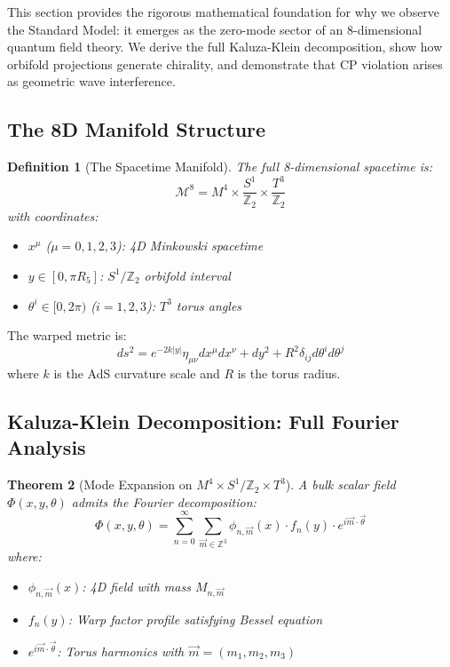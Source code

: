 \documentclass[12pt,a4paper]{article}
\newtheorem{theorem}{Theorem}[section]
\newtheorem{definition}[theorem]{Definition}
\begin{document}
This section provides the rigorous mathematical foundation for why we observe the Standard Model: it emerges as the zero-mode sector of an 8-dimensional quantum field theory. We derive the full Kaluza-Klein decomposition, show how orbifold projections generate chirality, and demonstrate that CP violation arises as geometric wave interference.

\subsection{The 8D Manifold Structure}

\begin{definition}[The Spacetime Manifold]
The full 8-dimensional spacetime is:
\begin{equation}
\mathcal{M}^8 = M^4 \times \frac{S^1}{\mathbb{Z}_2} \times \frac{T^3}{\mathbb{Z}_2}
\end{equation}
with coordinates:
\begin{itemize}
    \item $x^\mu$ ($\mu = 0,1,2,3$): 4D Minkowski spacetime
    \item $y \in [0, \pi R_5]$: $S^1/\mathbb{Z}_2$ orbifold interval
    \item $\theta^i \in [0, 2\pi)$ ($i = 1,2,3$): $T^3$ torus angles
\end{itemize}
\end{definition}

The warped metric is:
\begin{equation}
ds^2 = e^{-2k|y|}\eta_{\mu\nu}dx^\mu dx^\nu + dy^2 + R^2\delta_{ij}d\theta^i d\theta^j
\end{equation}
where $k$ is the AdS curvature scale and $R$ is the torus radius.

\subsection{Kaluza-Klein Decomposition: Full Fourier Analysis}

\begin{theorem}[Mode Expansion on $M^4 \times S^1/\mathbb{Z}_2 \times T^3$]
A bulk scalar field $\Phi(x,y,\theta)$ admits the Fourier decomposition:
\begin{equation}
\Phi(x,y,\theta) = \sum_{n=0}^{\infty} \sum_{\vec{m} \in \mathbb{Z}^3} \phi_{n,\vec{m}}(x) \cdot f_n(y) \cdot e^{i\vec{m}\cdot\vec{\theta}}
\end{equation}
where:
\begin{itemize}
    \item $\phi_{n,\vec{m}}(x)$: 4D field with mass $M_{n,\vec{m}}$
    \item $f_n(y)$: Warp factor profile satisfying Bessel equation
    \item $e^{i\vec{m}\cdot\vec{\theta}}$: Torus harmonics with $\vec{m} = (m_1, m_2, m_3)$
\end{itemize}
\end{theorem}
\end{document}
